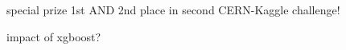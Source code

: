 special prize
1st AND 2nd place in second CERN-Kaggle challenge!

impact of xgboost?


\cite{chen14}